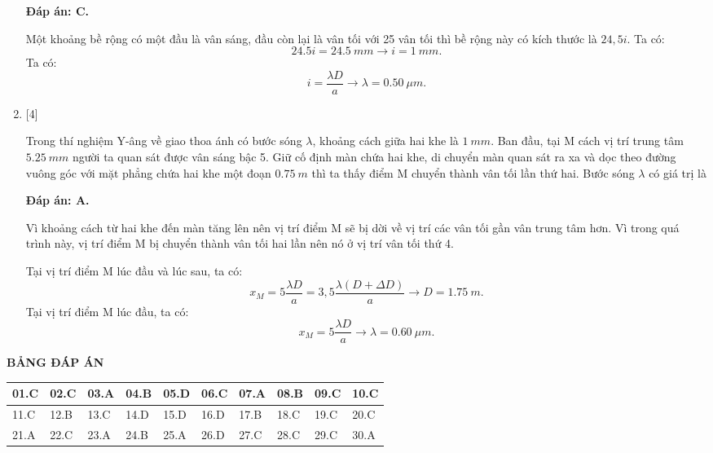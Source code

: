 \begin{enumerate}[label=\bfseries Câu \arabic*:]
\loigiai
{		\textbf{Đáp án: C.}
	
	Một khoảng bề rộng có một đầu là vân sáng, đầu còn lại là vân tối với 25 vân tối thì bề rộng này có kích thước là $24,5i$. Ta có:
	$$
	\num{24,5}i = \SI{24,5}{mm} \rightarrow i = \SI{1}{mm}.
	$$
	Ta có:
	$$
	i = \dfrac{\lambda D}{a} \rightarrow \lambda = \SI{0,50}{\mu m}.
	$$
}

\item {} [4]

\cauhoi
{Trong thí nghiệm Y-âng về giao thoa ánh có bước sóng $\lambda$, khoảng cách giữa hai khe là $\SI{1}{mm}$. Ban đầu, tại M cách vị trí trung tâm $\SI{5,25}{mm}$ người ta quan sát được vân sáng bậc 5. Giữ cố định màn chứa hai khe, di chuyển màn quan sát ra xa và dọc theo đường vuông góc với mặt phẳng chứa hai khe một đoạn $\SI{0,75}{m}$ thì ta thấy điểm M chuyển thành vân tối lần thứ hai. Bước sóng $\lambda$ có giá trị là
	\begin{mcq}(4)
		\item $\SI{0,60}{\mu m}$. 
		\item $\SI{0,50}{\mu m}$. 
		\item $\SI{0,70}{\mu m}$. 
		\item $\SI{0,64}{\mu m}$. 
	\end{mcq}
}

\loigiai
{		\textbf{Đáp án: A.}
	
	Vì khoảng cách từ hai khe đến màn tăng lên nên vị trí điểm M sẽ bị dời về vị trí các vân tối gần vân trung tâm hơn. Vì trong quá trình này, vị trí điểm M bị chuyển thành vân tối hai lần nên nó ở vị trí vân tối thứ 4.
	
	Tại vị trí điểm M lúc đầu và lúc sau, ta có:
	$$
	x_{M} = 5 \dfrac{\lambda D}{a} = 3,5 \dfrac{\lambda (D + \Delta D)}{a} \rightarrow D = \SI{1,75}{m}.
	$$
	Tại vị trí điểm M lúc đầu, ta có:
	$$
	x_{M} = 5 \dfrac{\lambda D}{a} \rightarrow \lambda = \SI{0,60}{\mu m}.
	$$
}
	
\end{enumerate}

\loigiai
{
	\begin{center}
		\textbf{BẢNG ĐÁP ÁN}
	\end{center}
	\begin{center}
		\begin{tabular}{|m{2.8em}|m{2.8em}|m{2.8em}|m{2.8em}|m{2.8em}|m{2.8em}|m{2.8em}|m{2.8em}|m{2.8em}|m{2.8em}|}
			\hline
			01.C  &  02.C  & 03.A  & 04.B  & 05.D  & 06.C  & 07.A  & 08.B  & 09.C  & 10.C \\
			\hline
			11.C  &  12.B  & 13.C  & 14.D  & 15.D  & 16.D  & 17.B  & 18.C  & 19.C  & 20.C \\
			\hline
			21.A  &  22.C  & 23.A  & 24.B  & 25.A  & 26.D  & 27.C  & 28.C  & 29.C  & 30.A \\
			\hline
			
		\end{tabular}
	\end{center}
}


